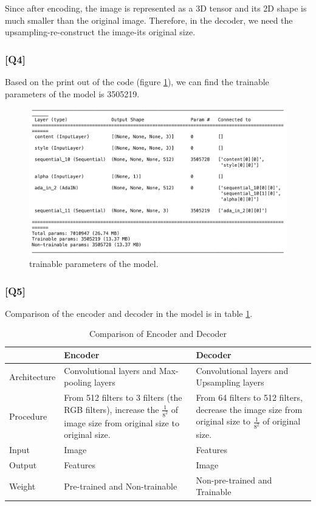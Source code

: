 \documentclass{article}
\begin{document}
Since after encoding, the image is represented as a 3D tensor and its 2D shape is much smaller than the original image. 
Therefore, in the decoder, we need the upsampling-re-construct the image-its original size.

\subsubsection*{[Q4]}
Based on the print out of the code (figure \ref{fig:trainable_parameters}), we can find the trainable parameters of the model is 3505219.

\begin{figure}[!ht]
    \centering
    \includegraphics[width=\textwidth]{./pic/trainable_para_model1.png}
    \caption{trainable parameters of the model.}
    \label{fig:trainable_parameters}
\end{figure}

\subsubsection*{[Q5]}

Comparison of the encoder and decoder in the model is in table \ref{tab:encoder_decoder_comparison}.


\begin{table}[ht]
    \centering
    \caption{Comparison of Encoder and Decoder}
    \label{tab:encoder_decoder_comparison}
    \begin{tabularx}{\textwidth}{l|XX}
    \toprule
    & \textbf{Encoder} & \textbf{Decoder} \\
    \midrule
    Architecture & Convolutional layers and Max-pooling layers & Convolutional layers and Upsampling layers \\
    Procedure & From 512 filters to 3 filters (the RGB filters), increase the $\frac{1}{8^2}$ of image size from original size to original size. & From 64 filters to 512 filters, decrease the image size from original size to $\frac{1}{8^2}$ of original size. \\
    Input & Image & Features \\
    Output & Features & Image \\
    Weight & Pre-trained and Non-trainable & Non-pre-trained and Trainable \\
    \bottomrule
    \end{tabularx}
    
\end{table}
\end{document}
